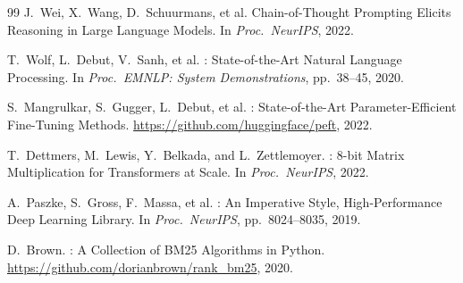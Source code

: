 \documentclass[runningheads]{llncs}
\begin{document}
\begin{thebibliography}{99}
  J.\ Wei, X.\ Wang, D.\ Schuurmans, et al.
  \newblock Chain-of-Thought Prompting Elicits Reasoning in Large Language Models.
  \newblock In \emph{Proc.\ NeurIPS}, 2022.

  T.\ Wolf, L.\ Debut, V.\ Sanh, et al.
  : State-of-the-Art Natural Language Processing.
  \newblock In \emph{Proc.\ EMNLP: System Demonstrations}, pp.\ 38--45, 2020.

  S.\ Mangrulkar, S.\ Gugger, L.\ Debut, et al.
  : State-of-the-Art Parameter-Efficient Fine-Tuning Methods.
  \newblock \url{https://github.com/huggingface/peft}, 2022.

  T.\ Dettmers, M.\ Lewis, Y.\ Belkada, and L.\ Zettlemoyer.
  : 8-bit Matrix Multiplication for Transformers at Scale.
  \newblock In \emph{Proc.\ NeurIPS}, 2022.

  A.\ Paszke, S.\ Gross, F.\ Massa, et al.
  : An Imperative Style, High-Performance Deep Learning Library.
  \newblock In \emph{Proc.\ NeurIPS}, pp.\ 8024--8035, 2019.

  D.\ Brown.
  : A Collection of BM25 Algorithms in Python.
  \newblock \url{https://github.com/dorianbrown/rank_bm25}, 2020.

\end{thebibliography}
\end{document}
